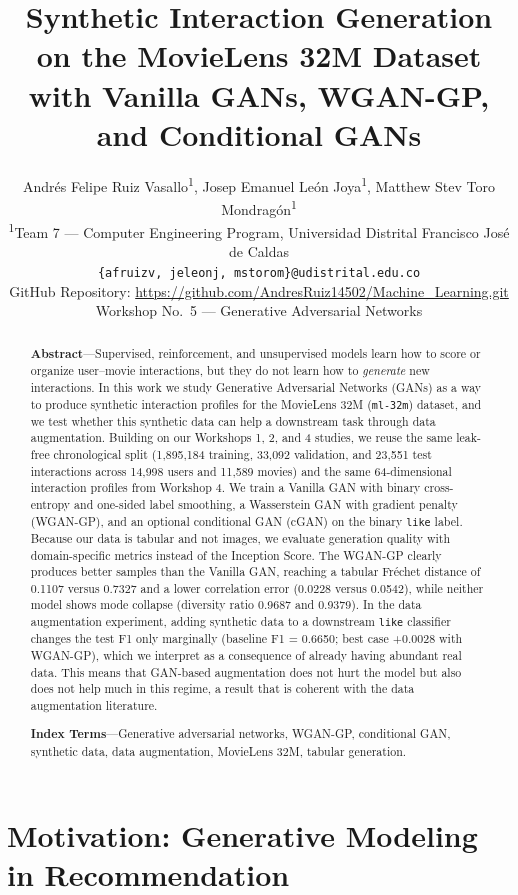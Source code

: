 \documentclass[10pt,twocolumn]{article}
\title{\vspace{-1.0cm}\textbf{\Large Synthetic Interaction Generation on the MovieLens 32M
Dataset with Vanilla GANs, WGAN-GP, and Conditional GANs}}
\author{
Andr\'es Felipe Ruiz Vasallo\textsuperscript{1}, \;
Josep Emanuel Le\'on Joya\textsuperscript{1}, \;
Matthew Stev Toro Mondrag\'on\textsuperscript{1} \\[2pt]
\small \textsuperscript{1}Team 7 --- Computer Engineering Program, Universidad Distrital Francisco Jos\'e de Caldas \\
\small \texttt{\{afruizv, jeleonj, mstorom\}@udistrital.edu.co} \\
\small GitHub Repository: \url{https://github.com/AndresRuiz14502/Machine_Learning.git} \\[2pt]
\small Workshop No.\ 5 --- Generative Adversarial Networks
}
\date{}
\begin{document}
\maketitle

\begin{abstract}
\small
\textbf{Abstract}---Supervised, reinforcement, and unsupervised models learn how to score
or organize user--movie interactions, but they do not learn how to \emph{generate} new
interactions. In this work we study Generative Adversarial Networks (GANs) as a way to
produce synthetic interaction profiles for the MovieLens 32M (\texttt{ml-32m}) dataset, and
we test whether this synthetic data can help a downstream task through data augmentation.
Building on our Workshops 1, 2, and 4 studies, we reuse the same leak-free chronological
split (1{,}895{,}184 training, 33{,}092 validation, and 23{,}551 test interactions across
14{,}998 users and 11{,}589 movies) and the same 64-dimensional interaction profiles from
Workshop 4. We train a Vanilla GAN with binary cross-entropy and one-sided label smoothing,
a Wasserstein GAN with gradient penalty (WGAN-GP), and an optional conditional GAN (cGAN)
on the binary \texttt{like} label. Because our data is tabular and not images, we evaluate
generation quality with domain-specific metrics instead of the Inception Score. The WGAN-GP
clearly produces better samples than the Vanilla GAN, reaching a tabular Fr\'echet distance
of 0.1107 versus 0.7327 and a lower correlation error (0.0228 versus 0.0542), while neither
model shows mode collapse (diversity ratio 0.9687 and 0.9379). In the data augmentation
experiment, adding synthetic data to a downstream \texttt{like} classifier changes the test
F1 only marginally (baseline F1 = 0.6650; best case +0.0028 with WGAN-GP), which we interpret
as a consequence of already having abundant real data. This means that GAN-based augmentation
does not hurt the model but also does not help much in this regime, a result that is coherent
with the data augmentation literature.

\vspace{4pt}
\noindent\textbf{Index Terms}---Generative adversarial networks, WGAN-GP, conditional GAN,
synthetic data, data augmentation, MovieLens 32M, tabular generation.
\end{abstract}

\section{Motivation: Generative Modeling in Recommendation}
\end{document}

